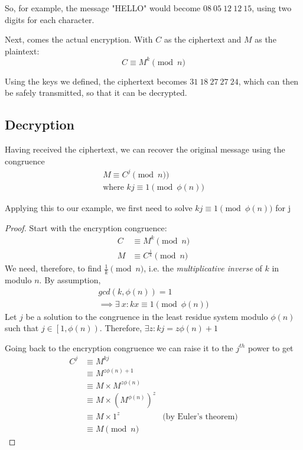 \documentclass[12pt]{article}
\begin{document}
    So, for example, the message "HELLO" would become $08\ 05\ 12\ 12\ 15$,
    using two digits for each character.

    Next, comes the actual encryption. With $C$ as the ciphertext and $M$ as the
    plaintext:
    \begin{equation*}
        C \equiv M^{k} \pmod{n}
    \end{equation*}

    Using the keys we defined, the ciphertext becomes $31\ 18\ 27\ 27\ 24$,
    which can then be safely transmitted, so that it can be decrypted.

    \subsection{Decryption}
    Having received the ciphertext, we can recover the original message using
    the congruence
    \begin{align*}
        M \equiv C^j \pmod{n})\\
        \text{where } kj \equiv 1 \pmod{\phi (n)}
    \end{align*}

    Applying this to our example, we first need to solve $
    kj \equiv 1 \pmod{\phi (n)}$ for j

    \begin{proof}
        Start with the encryption congruence: 
        \begin{align*}
            C & \equiv M^{k} \pmod{n}\\
            M & \equiv C^{\frac{1}{k}} \pmod{n}
        \end{align*}
        We need, therefore, to find $\frac{1}{k} \pmod{n}$, i.e. the
        \emph{multiplicative inverse} of $k$ in modulo $n$. By assumption, 
        \begin{align*}
            gcd(k, \phi (n)) = 1 \\
            \implies \exists\ x: kx \equiv 1 \pmod{\phi (n)}
        \end{align*}
        Let $j$ be a solution to the congruence in the least residue system
        modulo $\phi (n)$ such that $j \in \left[1, \phi (n) \right)$.
        Therefore, $\exists z: kj = z\phi (n) + 1$

        Going back to the encryption congruence we can raise it to the $j^{th}$
        power to get
        \begin{align*}
            C^j & \equiv M^{kj}\\ 
                & \equiv M^{z\phi (n) + 1}\\
                & \equiv M\times M^{z \phi(n)}\\
                & \equiv M\times (M^{\phi (n)})^z\\
                & \equiv M\times 1^z                &\text{(by Euler's theorem)}\\
                & \equiv M \pmod{n}
        \end{align*}
    \end{proof}
\end{document}
